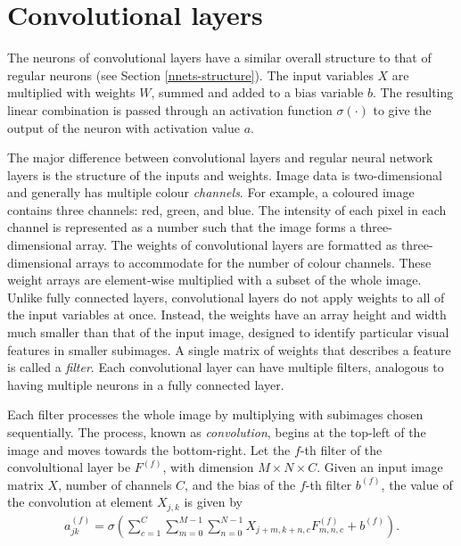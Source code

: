 \section{Convolutional layers}\label{convnets-convlayer}

The neurons of convolutional layers have a similar overall structure to that of regular neurons (see Section \ref{nnets-structure}). The input variables $X$ are multiplied with weights $W$, summed and added to a bias variable $b$. The resulting linear combination is passed through an activation function $\sigma(\cdot)$ to give the output of the neuron with activation value $a$.

The major difference between convolutional layers and regular neural network layers is the structure of the inputs and weights. Image data is two-dimensional and generally has multiple colour \textit{channels}. For example, a coloured image contains three channels: red, green, and blue. The intensity of each pixel in each channel is represented as a number such that the image forms a three-dimensional array. The weights of convolutional layers are formatted as three-dimensional arrays to accommodate for the number of colour channels. These weight arrays are element-wise multiplied with a subset of the whole image. Unlike fully connected layers, convolutional layers do not apply weights to all of the input variables at once. Instead, the weights have an array height and width much smaller than that of the input image, designed to identify particular visual features in smaller subimages. A single matrix of weights that describes a feature is called a \textit{filter}. Each convolutional layer can have multiple filters, analogous to having multiple neurons in a fully connected layer.

Each filter processes the whole image by multiplying with subimages chosen sequentially. The process, known as \textit{convolution}, begins at the top-left of the image and moves towards the bottom-right. Let the $f$-th filter of the convolultional layer be $F^{(f)}$, with dimension $M\times N \times C$. Given an input image matrix $X$, number of channels $C$, and the bias of the $f$-th filter $b^{(f)}$, the value of the convolution at element $X_{j,k}$ is given by
\begin{align}
	a_{jk}^{(f)} = \sigma\left(\sum_{c=1}^C\sum_{m=0}^{M-1}\sum_{n=0}^{N-1}X_{j+m, k+n, c}F_{m,n,c}^{(f)}  + b^{(f)}\right).
\end{align}

